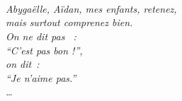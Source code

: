 {\Large
~\\
~\\
~\\
~\\
~\\
~\\
~\\
~\\
~\\
~\\
~\\
~\\
~\\
\begin{flushright}
\textit{
Abygaëlle, Aïdan, mes enfants, retenez,\\ mais surtout \emph{comprenez} bien.\\
On ne dit pas ~:\\
``C'est pas bon !'',\\
on dit~:\\
``Je n'aime pas.''\\
\ldots \\
}
\end{flushright}
}